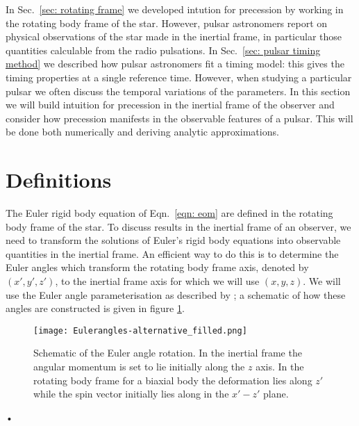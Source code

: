 \documentclass[../full_thesis/full_thesis.tex]{subfiles}
\begin{document}
In Sec.~\ref{sec: rotating frame} we developed intution for precession by
working in the rotating body frame of the star.  However, pulsar astronomers
report on physical observations of the star made in the inertial frame, in
particular those quantities calculable from the radio pulsations. In
Sec.~\ref{sec: pulsar timing method} we described how pulsar astronomers fit a
timing model: this gives the timing properties at a single reference time.
However, when studying a particular pulsar we often discuss the temporal
variations of the parameters. In this section we will build intuition for
precession in the inertial frame of the observer and consider how precession
manifests in the observable features of a pulsar. This will be done both
numerically and deriving analytic approximations.


\section{Definitions}

The Euler rigid body equation of Eqn.~\eqref{eqn: eom} are defined in the
rotating body frame of the star.  To discuss results in the inertial frame of
an observer, we need to transform the solutions of Euler's rigid body equations
into observable quantities in the inertial frame.  An efficient way to do this
is to determine the Euler angles which transform the rotating body frame axis,
denoted by $(x',y', z')$, to the inertial frame axis for which we will use $(x,
y, z)$. We will use the Euler angle parameterisation as described by
\citet{Landau1969}; a schematic of how these angles are constructed is given in
figure \ref{fig: Euler}.
\begin{figure}[ht]
\centering
\texttt{[image: Eulerangles-alternative\_filled.png]}
\caption{Schematic of the Euler angle rotation. In the inertial frame the
angular momentum is set to lie initially along the $z$ axis. In the rotating
body frame for a biaxial body the deformation lies along $z'$ while the spin
vector initially lies along in the $x'- z'$ plane.}
\label{fig: Euler}
\end{figure}•
\end{document}

